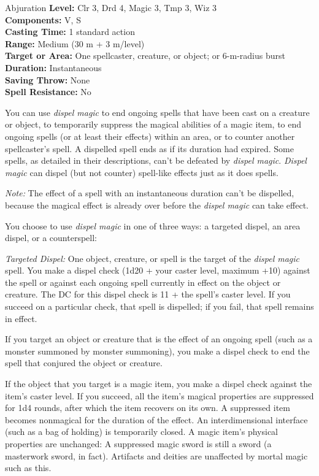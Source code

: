 {Abjuration}
{
	\textbf{Level:}
	Clr 3, Drd 4, Magic 3, Tmp 3, Wiz 3\\
	\textbf{Components:}
	V, S\\
	\textbf{Casting Time:}
	1 standard action\\
	\textbf{Range:}
	Medium (30 m + 3 m/level)\\
	\textbf{Target or Area:}
	One spellcaster, creature, or object; or 6-m-radius burst\\
	\textbf{Duration:}
	Instantaneous\\
	\textbf{Saving Throw:}
	None\\
	\textbf{Spell Resistance:}
	No\\
}
{
	You can use \emph{dispel magic} to end ongoing spells that have been cast on a creature or object, to temporarily suppress the magical abilities of a magic item, to end ongoing spells (or at least their effects) within an area, or to counter another spellcaster's spell. A dispelled spell ends as if its duration had expired. Some spells, as detailed in their descriptions, can't be defeated by \emph{dispel magic}. \emph{Dispel magic} can dispel (but not counter) spell-like effects just as it does spells.

	\textit{Note:} The effect of a spell with an instantaneous duration can't be dispelled, because the magical effect is already over before the \emph{dispel magic} can take effect.

	You choose to use \emph{dispel magic} in one of three ways: a targeted dispel, an area dispel, or a counterspell:

	\textit{Targeted Dispel:}
	One object, creature, or spell is the target of the \emph{dispel magic} spell. You make a dispel check (1d20 + your caster level, maximum +10) against the spell or against each ongoing spell currently in effect on the object or creature. The DC for this dispel check is 11 + the spell's caster level. If you succeed on a particular check, that spell is dispelled; if you fail, that spell remains in effect.

	If you target an object or creature that is the effect of an ongoing spell (such as a monster summoned by monster summoning), you make a dispel check to end the spell that conjured the object or creature.

	If the object that you target is a magic item, you make a dispel check against the item's caster level. If you succeed, all the item's magical properties are suppressed for 1d4 rounds, after which the item recovers on its own. A suppressed item becomes nonmagical for the duration of the effect. An interdimensional interface (such as a bag of holding) is temporarily closed. A magic item's physical properties are unchanged: A suppressed magic sword is still a sword (a masterwork sword, in fact). Artifacts and deities are unaffected by mortal magic such as this.

}
